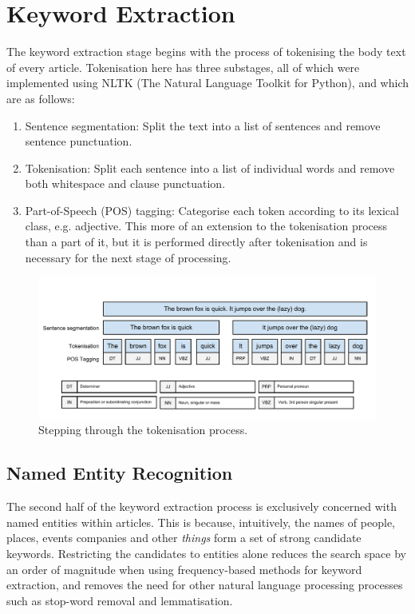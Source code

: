 \section{Keyword Extraction}

The keyword extraction stage begins with the process of tokenising the body text of every article. Tokenisation here has three substages, all of which were implemented using NLTK (The Natural Language Toolkit for Python), and which are as follows:
\begin{enumerate}
	\item Sentence segmentation: Split the text into a list of sentences and remove sentence punctuation.
	\item Tokenisation: Split each sentence into a list of individual words and remove both whitespace and clause punctuation.
	\item Part-of-Speech (POS) tagging: Categorise each token according to its lexical class, e.g. adjective. This more of an extension to the tokenisation process than a part of it, but it is performed directly after tokenisation and is necessary for the next stage of processing.
\end{enumerate}
\begin{figure}[htbp!]
	\centering
	\includegraphics[width=\textwidth]{img/implementation/Tokenisation.pdf}
	\caption{Stepping through the tokenisation process.}
	\label{fig:tokenisation}
\end{figure}

\subsection{Named Entity Recognition}

The second half of the keyword extraction process is exclusively concerned with named entities within articles. This is because, intuitively, the names of people, places, events companies and other \textit{things} form a set of strong candidate keywords. Restricting the candidates to entities alone reduces the search space by an order of magnitude when using frequency-based methods for keyword extraction, and removes the need for other natural language processing processes such as stop-word removal and lemmatisation.

